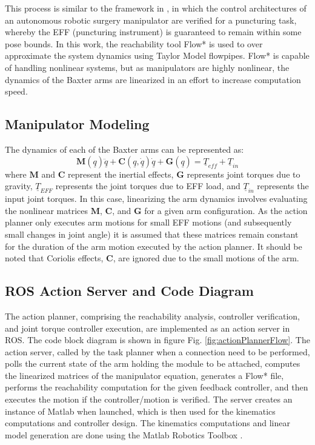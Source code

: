 This process is similar to the framework in \cite{6016596}, in which the control architectures of an autonomous robotic surgery manipulator are verified for a puncturing task, whereby the EFF (puncturing instrument) is guaranteed to remain within some pose bounds.
In this work, the reachability tool Flow* \cite{Chen2013} is used to over approximate the system dynamics using Taylor Model flowpipes.
Flow* is capable of handling nonlinear systems, but as manipulators are highly nonlinear, the dynamics of the Baxter arms are linearized in an effort to increase computation speed. 


\subsection{Manipulator Modeling}
The dynamics of each of the Baxter arms can be represented as:
\begin{equation}
	\mathbf{M}(\underline{q})\ddot{\underline{q}} + \mathbf{C}(\underline{q},\underline{\dot{q}})\dot{\underline{q}} + \mathbf{G}(\underline{q}) = \underline{T}_{eff} + \underline{T}_{in}
\end{equation}
where $\mathbf{M}$ and $\mathbf{C}$ represent the inertial effects, $\mathbf{G}$ represents joint torques due to gravity, $\underline{T}_{EFF}$ represents the joint torques due to EFF load, and $\underline{T}_{in}$ represents the input joint torques.
In this case, linearizing the arm dynamics involves evaluating the nonlinear matrices $\mathbf{M}$, $\mathbf{C}$, and $\mathbf{G}$ for a given arm configuration.
As the action planner only executes arm motions for small EFF motions (and subsequently small changes in joint angle) it is assumed that these matrices remain constant for the duration of the arm motion executed by the action planner.
It should be noted that Coriolis effects, $\mathbf{C}$, are ignored due to the small motions of the arm.


\subsection{ROS Action Server and Code Diagram}
The action planner, comprising the reachability analysis, controller verification, and joint torque controller execution, are implemented as an action server in ROS.
The code block diagram is shown in figure Fig. \ref{fig:actionPlannerFlow}.
The action server, called by the task planner when a connection need to be performed, polls the current state of the arm holding the module to be attached, computes the linearized matrices of the manipulator equation, generates a Flow* file, performs the reachability computation for the given feedback controller, and then executes the motion if the controller/motion is verified.
The server creates an instance of Matlab when launched, which is then used for the kinematics computations and controller design.
The kinematics computations and linear model generation are done using the Matlab Robotics Toolbox \cite{Corke11a}.


